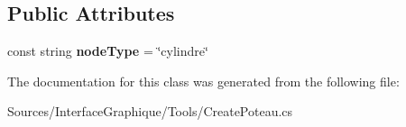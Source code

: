\subsection*{Public Attributes}
\begin{DoxyCompactItemize}
\item 
\hypertarget{class_interface_graphique_1_1_tools_1_1_create_poteau_afbc3cc3c600255e7d9d12cf06b082a04}{}const string {\bfseries node\+Type} = \char`\"{}cylindre\char`\"{}\label{class_interface_graphique_1_1_tools_1_1_create_poteau_afbc3cc3c600255e7d9d12cf06b082a04}

\end{DoxyCompactItemize}


The documentation for this class was generated from the following file\+:\begin{DoxyCompactItemize}
\item 
Sources/\+Interface\+Graphique/\+Tools/Create\+Poteau.\+cs\end{DoxyCompactItemize}
